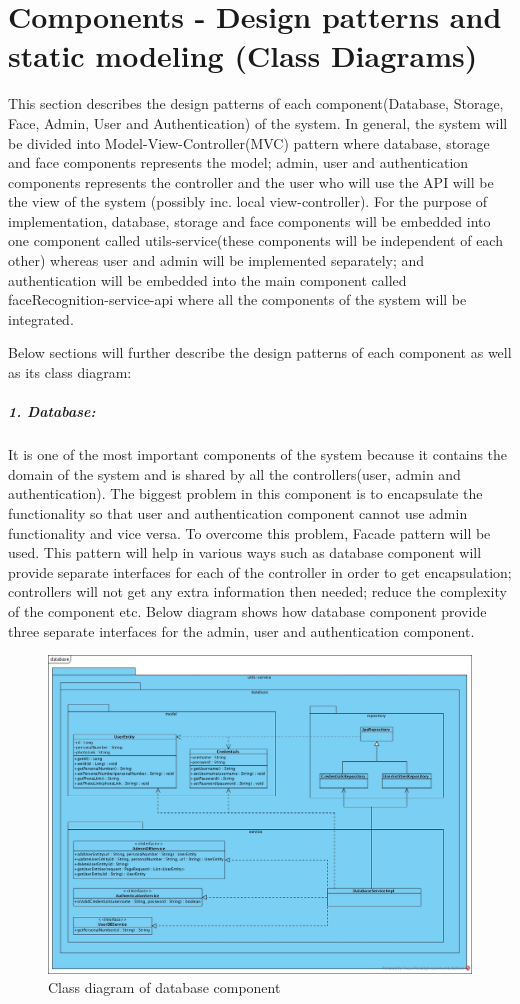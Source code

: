 \documentclass[a4paper,11pt]{article}
\begin{document}
\section{Components - Design patterns and static modeling (Class Diagrams)}
This section describes the design patterns of each component(Database, Storage, Face, Admin, User and Authentication) of the system. In general, the system will be divided into Model-View-Controller(MVC) pattern where database, storage and face components represents the model; admin, user and authentication components represents the controller and the user who will use the API will be the view of the system (possibly inc. local view-controller). For the purpose of implementation, database, storage and face components will be embedded into one component called utils-service(these components will be independent of each other) whereas user and admin will be implemented separately; and authentication will be embedded into the main component called faceRecognition-service-api where all the components of the system will be integrated.
\newline

\noindent
Below sections will further describe the design patterns of each component as well as its class diagram:

\subparagraph{1. Database: }It is one of the most important components of the system because it contains the domain of the system and is shared by all the controllers(user, admin and authentication). The biggest problem in this component is to encapsulate the functionality so that user and authentication component cannot use admin functionality and vice versa. To overcome this problem, Facade pattern will be used. This pattern will help in various ways such as database component will provide separate interfaces for each of the controller in order to get encapsulation; controllers will not get any extra information then needed; reduce the complexity of the component etc. Below diagram shows how database component provide three separate interfaces for the admin, user and authentication component.

\begin{figure}[ht!]
    \centering
	\includegraphics[width=130mm]{ClassDiagrams/new/database.jpg}
	\caption{Class diagram of database component}
\end{figure}
\end{document}
